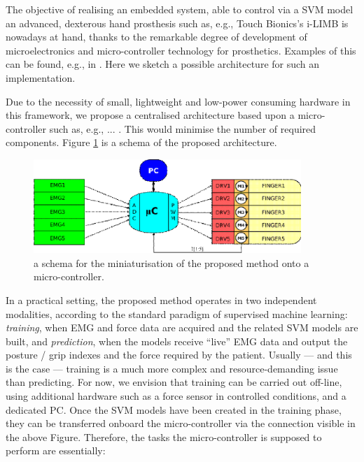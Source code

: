 The objective of realising an embedded system, able to control via a
SVM model an advanced, dexterous hand prosthesis such as, e.g., Touch
Bionics's i-LIMB is nowadays at hand, thanks to the remarkable degree
of development of microelectronics and micro-controller technology for
prosthetics. Examples of this can be found, e.g., in \cite{...}. Here
we sketch a possible architecture for such an implementation.

Due to the necessity of small, lightweight and low-power consuming
hardware in this framework, we propose a centralised architecture
based upon a micro-controller such as, e.g., ... \cite{...}. This
would minimise the number of required components. Figure \ref{fig:mc}
is a schema of the proposed architecture.

\begin{figure}[!ht] \centering
  \includegraphics[width=0.9\textwidth]{figs/mc}
  \caption{a schema for the miniaturisation of the proposed method
    onto a micro-controller.}
  \label{fig:mc}
\end{figure}

In a practical setting, the proposed method operates in two
independent modalities, according to the standard paradigm of
supervised machine learning: \emph{training}, when EMG and force data
are acquired and the related SVM models are built, and
\emph{prediction}, when the models receive ``live'' EMG data and
output the posture / grip indexes and the force required by the
patient. Usually --- and this is the case --- training is a much more
complex and resource-demanding issue than predicting. For now, we
envision that training can be carried out off-line, using additional
hardware such as a force sensor in controlled conditions, and a
dedicated PC. Once the SVM models have been created in the training
phase, they can be transferred onboard the micro-controller via the
connection visible in the above Figure. Therefore, the tasks the
micro-controller is supposed to perform are essentially:

